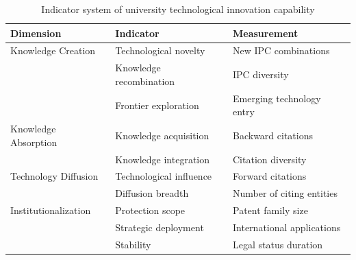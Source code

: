 
\begin{table}[ht]
\centering
\caption{Indicator system of university technological innovation capability}
\begin{tabular}{lll}
\toprule
Dimension & Indicator & Measurement\\
\midrule
Knowledge Creation & Technological novelty & New IPC combinations\\
 & Knowledge recombination & IPC diversity\\
 & Frontier exploration & Emerging technology entry\\
\midrule
Knowledge Absorption & Knowledge acquisition & Backward citations\\
 & Knowledge integration & Citation diversity\\
\midrule
Technology Diffusion & Technological influence & Forward citations\\
 & Diffusion breadth & Number of citing entities\\
\midrule
Institutionalization & Protection scope & Patent family size\\
 & Strategic deployment & International applications\\
 & Stability & Legal status duration\\
\bottomrule
\end{tabular}
\end{table}

